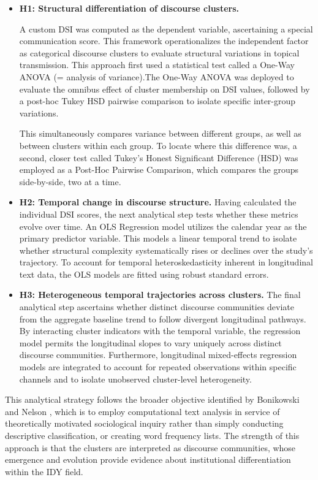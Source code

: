 \documentclass[11pt]{article}
\begin{document}
\begin{itemize}


\item \textbf{H1: Structural differentiation of discourse clusters.}

A custom DSI was computed as the dependent variable, ascertaining a special communication score. This framework operationalizes the independent factor as categorical discourse clusters to evaluate structural variations in topical transmission. This approach first used a statistical test called a One-Way ANOVA (= analysis of variance).The One-Way ANOVA was deployed to evaluate the omnibus effect of cluster membership on DSI values, followed by a post-hoc Tukey HSD pairwise comparison to isolate specific inter-group variations.

 This simultaneously compares variance between different groups, as well as between clusters within each group. To locate where this difference was, a second, closer test called Tukey’s Honest Significant Difference (HSD) was employed as a Post-Hoc Pairwise Comparison, which compares the groups side-by-side, two at a time. 

\item \textbf{H2: Temporal change in discourse structure.}
Having calculated the individual DSI scores, the next analytical step tests whether these metrics evolve over time. An OLS Regression model utilizes the calendar year as the primary predictor variable. This models a linear temporal trend to isolate whether structural complexity systematically rises or declines over the study's trajectory. To account for temporal heteroskedasticity inherent in longitudinal text data, the OLS models are fitted using robust standard errors.

\item \textbf{H3: Heterogeneous temporal trajectories across clusters.}
The final analytical step ascertains whether distinct discourse communities deviate from the aggregate baseline trend to follow divergent longitudinal pathways. By interacting cluster indicators with the temporal variable, the regression model permits the longitudinal slopes to vary uniquely across distinct discourse communities. Furthermore, longitudinal mixed-effects regression models are integrated to account for repeated observations within specific channels and to isolate unobserved cluster-level heterogeneity.


\end{itemize}

This analytical strategy follows the broader objective identified by Bonikowski and Nelson \cite{bonikowski2022}, which is to employ computational text analysis in service of theoretically motivated sociological inquiry rather than simply conducting descriptive classification, or creating word frequency lists. The strength of this approach is that the clusters are interpreted as discourse communities, whose emergence and evolution provide evidence about institutional differentiation within the IDY field. 
\end{document}

